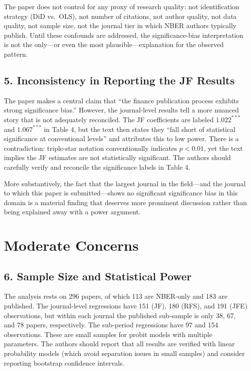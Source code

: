 \documentclass[12pt]{article}
\begin{document}
The paper does not control for any proxy of research quality: not
identification strategy (DiD vs.\ OLS), not number of citations, not author
quality, not data quality, not sample size, not the journal tier in which
NBER authors typically publish.  Until these confounds are addressed, the
significance-bias interpretation is not the only---or even the most
plausible---explanation for the observed pattern.

\subsection*{5. Inconsistency in Reporting the JF Results}

The paper makes a central claim that ``the finance publication process
exhibits strong significance bias.''  However, the journal-level results tell
a more nuanced story that is not adequately reconciled.  The JF coefficients
are labeled $1.022^{***}$ and $1.067^{***}$ in Table 4, but the text then
states they ``fall short of statistical significance at conventional levels''
and attributes this to low power.  There is a contradiction: triple-star
notation conventionally indicates $p < 0.01$, yet the text implies the JF
estimates are not statistically significant.  The authors should carefully
verify and reconcile the significance labels in Table 4.

More substantively, the fact that the largest journal in the field---and the
journal to which this paper is submitted---shows no significant significance
bias in this domain is a material finding that deserves more prominent
discussion rather than being explained away with a power argument.

\section{Moderate Concerns}

\subsection*{6. Sample Size and Statistical Power}

The analysis rests on 296 papers, of which 113 are NBER-only and 183 are
published.  The journal-level regressions have 151 (JF), 180 (RFS), and 191
(JFE) observations, but within each journal the published sub-sample is only
38, 67, and 78 papers, respectively.  The sub-period regressions have 97 and
154 observations.  These are small samples for probit models with multiple
parameters.  The authors should report that all results are verified with
linear probability models (which avoid separation issues in small samples)
and consider reporting bootstrap confidence intervals.
\end{document}
